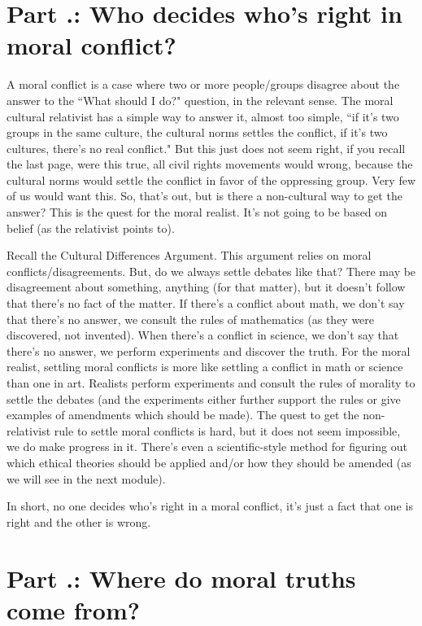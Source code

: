 \section{Part \thechapcount.\theseccount: Who decides who's right in moral conflict?}

A moral conflict is a case where two or more people/groups disagree about the answer to the ``What should I do?" question, in the relevant sense. The moral cultural relativist has a simple way to answer it, almost too simple, ``if it's two groups in the same culture, the cultural norms settles the conflict, if it's two cultures, there's no real conflict." But this just does not seem right, if you recall the last page, were this true, all civil rights movements would wrong, because the cultural norms would settle the conflict in favor of the oppressing group. Very few of us would want this. So, that's out, but is there a non-cultural way to get the answer? This is the quest for the moral realist. It's not going to be based on belief (as the relativist points to).

Recall the Cultural Differences Argument. This argument relies on moral conflicts/disagreements. But, do we always settle debates like that? There may be disagreement about something, anything (for that matter), but it doesn't follow that there's no fact of the matter. If there's a conflict about math, we don't say that there's no answer, we consult the rules of mathematics (as they were discovered, not invented). When there's a conflict in science, we don't say that there's no answer, we perform experiments and discover the truth. For the moral realist, settling moral conflicts is more like settling a conflict in math or science than one in art. Realists perform experiments and consult the rules of morality to settle the debates (and the experiments either further support the rules or give examples of amendments which should be made). The quest to get the non-relativist rule to settle moral conflicts is hard, but it does not seem impossible, we do make progress in it. There's even a scientific-style method for figuring out which ethical theories should be applied and/or how they should be amended (as we will see in the next module).

In short, no one decides who's right in a moral conflict, it's just a fact that one is right and the other is wrong.

\section{Part \thechapcount.\theseccount: Where do moral truths come from?}

